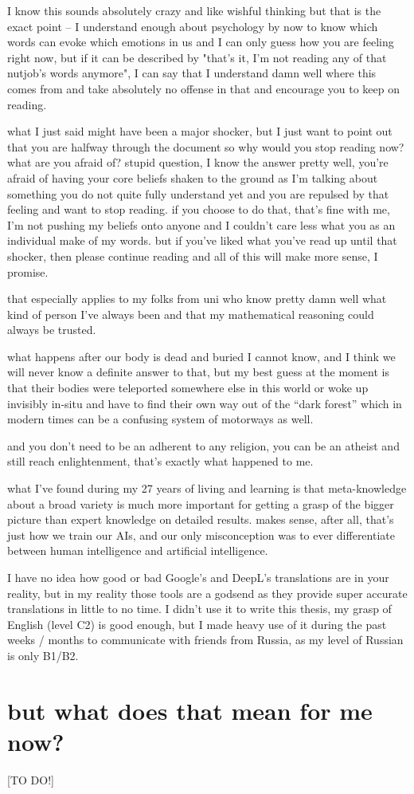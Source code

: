 \documentclass[12pt]{report}
\theoremstyle{definition}
\theoremstyle{remark}
\begin{document}
I know this sounds absolutely crazy and like wishful thinking but that is the exact point -- I understand enough about psychology by now to know which words can evoke which emotions in us and I can only guess how you are feeling right now, but if it can be described by "that's it, I'm not reading any of that nutjob's words anymore", I can say that I understand damn well where this comes from and take absolutely no offense in that and encourage you to keep on reading.

what I just said might have been a major shocker, but I just want to point out that you are halfway through the document so why would you stop reading now? what are you afraid of? stupid question, I know the answer pretty well, you're afraid of having your core beliefs shaken to the ground as I'm talking about something you do not quite fully understand yet and you are repulsed by that feeling and want to stop reading. if you choose to do that, that's fine with me, I'm not pushing my beliefs onto anyone and I couldn't care less what you as an individual make of my words. but if you've liked what you've read up until that shocker, then please continue reading and all of this will make more sense, I promise.

that especially applies to my folks from uni who know pretty damn well what kind of person I've always been and that my mathematical reasoning could always be trusted.

what happens after our body is dead and buried I cannot know, and I think we will never know a definite answer to that, but my best guess at the moment is that their bodies were teleported somewhere else in this world or woke up invisibly in-situ and have to find their own way out of the ``dark forest'' which in modern times can be a confusing system of motorways as well.

and you don't need to be an adherent to any religion, you can be an atheist and still reach enlightenment, that's exactly what happened to me.

what I've found during my 27 years of living and learning is that meta-knowledge about a broad variety is much more important for getting a grasp of the bigger picture than expert knowledge on detailed results. makes sense, after all, that's just how we train our AIs, and our only misconception was to ever differentiate between human intelligence and artificial intelligence.

I have no idea how good or bad Google's and DeepL's translations are in your reality, but in my reality those tools are a godsend as they provide super accurate translations in little to no time. I didn't use it to write this thesis, my grasp of English (level C2) is good enough, but I made heavy use of it during the past weeks / months to communicate with friends from Russia, as my level of Russian is only B1/B2.

\section{but what does that mean for me now?}

[TO DO!]

\printbibliography
\end{document}
